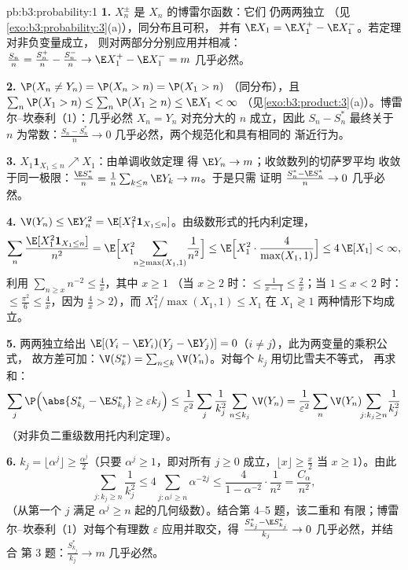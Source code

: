 \begin{solution}{pb:b3:probability:1}
\textbf{1.} $X_n^{\pm}$ 是 $X_n$ 的博雷尔函数：它们
仍两两独立
（见\cref{exo:b3:probability:3}(a)），同分布且可积，
并有 $\E X_1 = \E X_1^+ - \E
X_1^-$。若定理对非负变量成立，
则对两部分分别应用并相减：
$\frac{S_n}n = \frac{S_n^+}n - \frac{S_n^-}n \to \E X_1^+ -
\E X_1^- = m$ 几乎必然。

\textbf{2.} $\P(X_n \neq Y_n) = \P(X_n > n) = \P(X_1 > n)$
（同分布），且 $\sum_n\P(X_1 > n) \leq \sum_n\P(X_1
\geq n) \leq \E X_1 < \infty$
（见\cref{exo:b3:product:3}(a)）。博雷尔--坎泰利（1）：几乎必然
$X_n = Y_n$ 对充分大的 $n$ 成立，因此 $S_n - S_n^*$
最终关于 $n$ 为常数：$\frac{S_n - S_n^*}n \to 0$
几乎必然，两个规范化和具有相同的
渐近行为。

\textbf{3.} $X_1\mathbf 1_{X_1 \leq n} \nearrow X_1$：由单调收敛定理
得 $\E Y_n \to m$；收敛数列的切萨罗平均
收敛于同一极限：$\frac{\E S_n^*}n =
\frac1n\sum_{k\leq n}\E Y_k \to m$。于是只需
证明 $\frac{S^*_n - \E S^*_n}{n} \to 0$ 几乎必然。

\textbf{4.} $\V(Y_n) \leq \E Y_n^2 = \E[X_1^2\mathbf
1_{X_1\leq n}]$。由级数形式的托内利定理，
\[
\sum_n\frac{\E[X_1^2\mathbf 1_{X_1\leq n}]}{n^2}
= \E\Bigl[X_1^2\!\!\sum_{n \geq \max(X_1, 1)}\!\frac1{n^2}
\Bigr]
\leq \E\Bigl[X_1^2\cdot\frac{4}{\max(X_1,1)}\Bigr]
\leq 4\,\E[X_1] < \infty,
\]
利用 $\sum_{n\geq x}n^{-2} \leq \frac4x$，其中 $x \geq 1$
（当 $x \geq 2$ 时：$\leq \frac1{x-1} \leq \frac2x$；当 $1
\leq x < 2$ 时：$\leq \frac{\pi^2}6 \leq \frac4x$，因为
$\frac4x > 2$），而 $X_1^2/\max(X_1, 1) \leq X_1$ 在
$X_1 \gtrless 1$ 两种情形下均成立。

\textbf{5.} 两两独立给出 $\E[(Y_i - \E
Y_i)(Y_j - \E Y_j)] = 0$（$i \neq j$），此为两变量的乘积公式，
故方差可加：$\V(S^*_k) =
\sum_{n\leq k}\V(Y_n)$。对每个 $k_j$ 用切比雪夫不等式，
再求和：
\[
\sum_j\P\Bigl(\abs{S^*_{k_j} - \E S^*_{k_j}} \geq
\varepsilon k_j\Bigr)
\leq \frac1{\varepsilon^2}\sum_j\frac1{k_j^2}\sum_{n\leq
k_j}\V(Y_n)
= \frac1{\varepsilon^2}\sum_n\V(Y_n)\!\!\sum_{j : k_j\geq
n}\!\frac1{k_j^2}
\]
（对非负二重级数用托内利定理）。

\textbf{6.} $k_j = \lfloor\alpha^j\rfloor \geq
\frac{\alpha^j}2$（只要 $\alpha^j \geq 1$，即对所有
$j \geq 0$ 成立，$\lfloor x\rfloor \geq \frac x2$ 当 $x \geq
1$）。由此
\[
\sum_{j : k_j \geq n}\frac1{k_j^2}
\leq 4\sum_{j : \alpha^j \geq n}\alpha^{-2j}
\leq \frac{4}{1 - \alpha^{-2}}\cdot\frac1{n^2}
= \frac{C_\alpha}{n^2},
\]
（从第一个 $j$ 满足 $\alpha^j \geq
n$ 起的几何级数）。结合第 4--5 题，该二重和
有限；博雷尔--坎泰利（1）对每个有理数
$\varepsilon$ 应用并取交，得
$\frac{S^*_{k_j} - \E S^*_{k_j}}{k_j} \to 0$ 几乎必然，并结合
第 3 题：$\frac{S^*_{k_j}}{k_j} \to m$ 几乎必然。


\end{solution}
